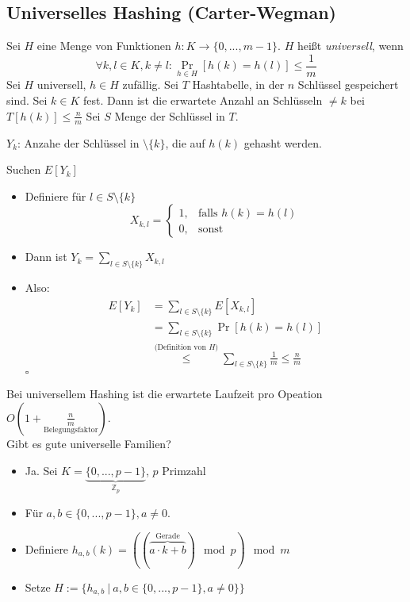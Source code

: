 \subsection[Universelles Hashing]{Universelles Hashing (Carter-Wegman)}
\Defi Sei $H$ eine Menge von Funktionen $h{:} K \to \{0,...,m-1\}$. $H$ heißt \emph{universell}, wenn 
\[\forall k, l \in K, k \neq l{:} \operatorname{Pr}_{h \in H}\left[h(k) = h(l)\right] \leq \frac{1}{m}\]
\Satz Sei $H$ universell, $h \in H$ zufällig. Sei $T$ Hashtabelle, in der $n$ Schlüssel gespeichert sind. Sei $k \in K$ fest. Dann ist die erwartete Anzahl an Schlüsseln $\neq k$ bei $T[h(k)] \leq \frac{n}{m}$
\Bew Sei $S$ Menge der Schlüssel in $T$.
    \begin{description}
     \item $Y_k$: Anzahe der  Schlüssel in $ \setminus \{k\}$, die auf $h(k)$ gehasht werden.
    \end{description}
    Suchen $E[Y_k]$
    \begin{itemize}
     \item Definiere für $l \in S \setminus \{k\}$
             \[X_{k,l} = \begin{cases}
                          1, & \text{falls $h(k) = h(l)$} \\
                          0, & \text{sonst}
                         \end{cases}\]
     \item Dann ist $Y_k = \sum\limits_{l \in S \setminus \{k\}} X_{k,l}$
     \item Also:
         \begin{align*}
          E[Y_k] &= \sum\limits_{l \in S \setminus \{k\}} E[X_{k,l}] \\
                 &= \sum\limits_{l \in S \setminus \{k\}} \operatorname{Pr}[h(k) = h(l)] \\
                 &\overset{\text{(Definition von $H$)}}{\leq} \sum\limits_{l \in S \setminus \{k\}} \frac{1}{m} \leq \frac{n}{m}
         \end{align*}\hfill$\square$
    \end{itemize}
Bei universellem Hashing ist die erwartete Laufzeit pro Opeation $O\left(1+\underset{\text{Belegungsfaktor}}{\frac{n}{m}}\right)$.\\
Gibt es gute universelle Familien?
\begin{itemize}
 \item Ja. Sei $K = \underbrace{\{0, ..., p-1\}}_{\mathbb{Z}_p}$, $p$ Primzahl
 \item Für $a,b \in \{0, ..., p-1\}, a \neq 0$.
 \item Definiere $h_{a,b}(k) = ((\overbrace{a \cdot k + b}^{\text{Gerade}}) \mod p) \mod m$
 \item Setze $H := \{h_{a,b}\ |\ a,b \in \{0, ..., p-1\}, a \neq 0\}\}$
\end{itemize}
